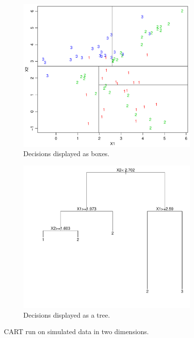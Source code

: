\begin{figure}[h!]
  \centering
  \begin{subfigure}[b]{0.48\textwidth}
    \includegraphics[width=\textwidth]{./figures/cartAreas1.pdf}
    \caption{Decisions displayed as boxes.}
    \label{fig:cartAreas1}
  \end{subfigure}%
  \quad
  \begin{subfigure}[b]{0.48\textwidth}
    \includegraphics[width=\textwidth]{./figures/cartTree1.pdf}
    \caption{Decisions displayed as a tree.}
    \label{fig:cartTree1}
  \end{subfigure}
  \vspace{1\baselineskip}
  \caption{CART run on simulated data in two dimensions. }
  \label{fig:animals}
\end{figure}
